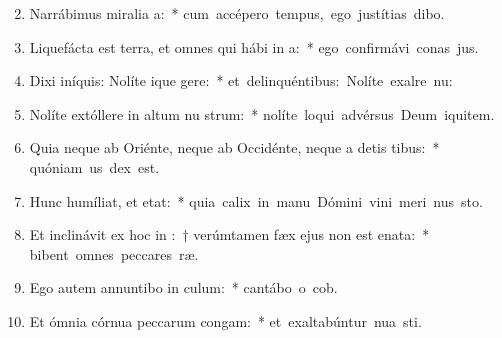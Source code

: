\begin{flushleft}
\begin{enumerate}[leftmargin=*]
\setcounter{enumi}{1}


\item Narrábimus miralia a:~* \mbox{cum accépero tempus, ego justítias dibo.}
\item Liquefácta est terra, et omnes qui hábi in a:~* \mbox{ego confirmávi conas jus.}
\item Dixi iníquis: Nolíte ique gere:~* \mbox{et delinquéntibus: Nolíte exalre nu:}
\item Nolíte extóllere in altum nu strum:~* \mbox{nolíte loqui advérsus Deum iquitem.}
\item Quia neque ab Oriénte, neque ab Occidénte, neque a detis tibus:~* \mbox{quóniam us dex est.}
\item Hunc humíliat, et  etat:~* \mbox{quia calix in manu Dómini vini meri nus sto.}
\item Et inclinávit ex hoc in :~† verúmtamen fæx ejus non est enata:~* \mbox{bibent omnes peccares ræ.}
\item Ego autem annuntibo in culum:~* \mbox{cantábo o cob.}
\item Et ómnia córnua peccarum congam:~* \mbox{et exaltabúntur nua sti.}

\end{enumerate}
\end{flushleft}

